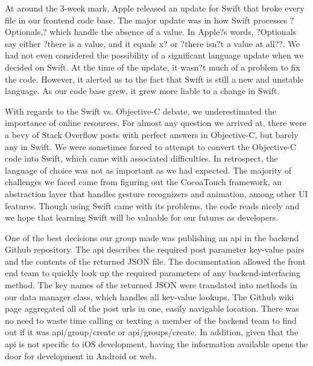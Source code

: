 \documentclass[12pt]{article}
\begin{document}
\bigskip

At around the 3-week mark, Apple released an update for Swift that broke every file in our frontend code base. The major update was in how Swift processes ?Optionals,? which handle the absence of a value. In Apple?s words, ?Optionals say either ?there is a value, and it equals x? or ?there isn?t a value at all??. We had not even considered the possibility of a significant language update when we decided on Swift. At the time of the update, it wasn?t much of a problem to fix the code. However, it alerted us to the fact that Swift is still a new and unstable language. As our code base grew, it grew more liable to a change in Swift.

\bigskip

With regards to the Swift vs. Objective-C debate, we underestimated the importance of online resources. For almost any question we arrived at, there were a bevy of Stack Overflow posts with perfect answers in Objective-C, but barely any in Swift. We were sometimes forced to attempt to convert the Objective-C code into Swift, which came with associated difficulties. In retrospect, the language of choice was not as important as we had expected. The majority of challenges we faced came from figuring out the CocoaTouch framework, an abstraction layer that handles gesture recognizers and animation, among other UI features. Though using Swift came with its problems, the code reads nicely and we hope that learning Swift will be valuable for our futures as developers.

\bigskip

One of the best decisions our group made was publishing an api in the backend Github repository. The api describes the required post parameter key-value pairs and the contents of the returned JSON file. The documentation allowed the front end team to quickly look up the required parameters of any backend-interfacing method. The key names of the returned JSON were translated into methods in our data manager class, which handles all key-value lookups. The Github wiki page aggregated all of the post urls in one, easily navigable location. There was no need to waste time calling or texting a member of the backend team to find out if it was api/group/create or api/groups/create. In addition, given that the api is not specific to iOS development, having the information available opens the door for development in Android or web.

\bigskip
\end{document}
